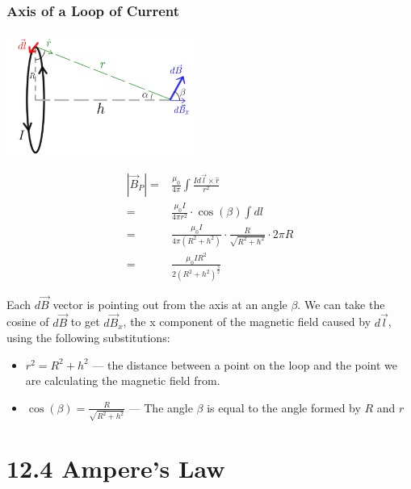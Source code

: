 \documentclass[12pt, titlepage]{article}
\begin{document}
\subsubsection*{Axis of a Loop of Current}

\begin{center}
    \includegraphics*[height=4cm]{media/axis.png}
\end{center}

\begin{align*}
    |\vec{B}_P| =& \frac{\mu_0}{4\pi} \int \frac{Id\vec{l}\times\hat{r}}{r^2} \\
    =& \frac{\mu_0I}{4 \pi r^2} \cdot \cos(\beta)\int dl \\
    =& \frac{\mu_0I}{4 \pi (R^2+h^2)} \cdot \frac{R}{\sqrt{R^2+h^2}} \cdot 2 \pi R \\
    =& \boxed{\frac{\mu_0 IR^2}{2(R^2+h^2)^\frac{3}{2}}}
\end{align*}

Each $d\vec{B}$ vector is pointing out from the axis at an angle $\beta$. We can take the cosine of $d\vec{B}$ to get $d\vec{B}_x$, the x component of the magnetic field caused by $d\vec{l}$, using the following substitutions:
\begin{itemize}
    \item $r^2=R^2+h^2$ --- the distance between a point on the loop and the point we are calculating the magnetic field from.
    \item $\cos (\beta) = \frac{R}{\sqrt{R^2+h^2}}$ --- The angle $\beta$ is equal to the angle formed by $R$ and $r$ 
\end{itemize}

\section*{12.4 Ampere's Law}
\end{document}
